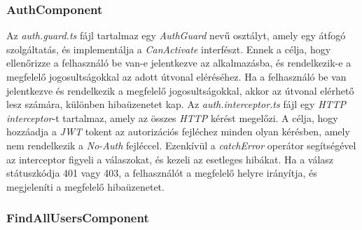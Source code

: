 \subsubsection{AuthComponent}

Az \textit{auth.guard.ts} fájl tartalmaz egy \textit{AuthGuard} nevű osztályt, amely egy átfogó szolgáltatás, és implementálja a \textit{CanActivate} interfészt. Ennek a célja, hogy ellenőrizze a felhasználó be van-e jelentkezve az alkalmazásba, és rendelkezik-e a megfelelő jogosultságokkal az adott útvonal eléréséhez. Ha a felhasználó be van jelentkezve és rendelkezik a megfelelő jogosultságokkal, akkor az útvonal elérhető lesz számára, különben hibaüzenetet kap. Az \textit{auth.interceptor.ts} fájl egy \textit{HTTP interceptor}-t tartalmaz, amely az összes \textit{HTTP} kérést megelőzi. A célja, hogy hozzáadja a \textit{JWT} tokent az autorizációs fejléchez minden olyan kérésben, amely nem rendelkezik a \textit{No-Auth} fejléccel. Ezenkívül a \textit{catchError} operátor segítségével az interceptor figyeli a válaszokat, és kezeli az esetleges hibákat. Ha a válasz státuszkódja 401 vagy 403, a felhasználót a megfelelő helyre irányítja, és megjeleníti a megfelelő hibaüzenetet.


\subsubsection{FindAllUsersComponent}

